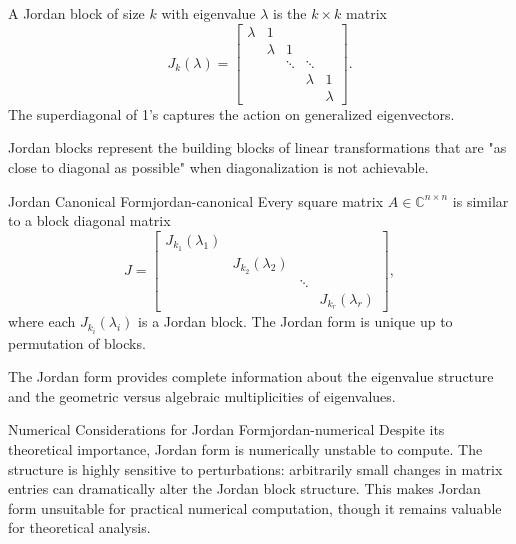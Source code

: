 \documentclass[../../main.tex]{subfiles}
\begin{document}
A Jordan block of size $k$ with eigenvalue $\lambda$ is the $k \times k$ matrix
\[
    J_k(\lambda) = \begin{bmatrix}
        \lambda & 1       &        &         &         \\
                & \lambda & 1      &         &         \\
                &         & \ddots & \ddots  &         \\
                &         &        & \lambda & 1       \\
                &         &        &         & \lambda
    \end{bmatrix}.
\]
The superdiagonal of 1's captures the action on generalized eigenvectors.

Jordan blocks represent the building blocks of linear transformations that are "as close to diagonal as possible" when diagonalization is not achievable.

\begin{definition}{Jordan Canonical Form}{jordan-canonical}
    Every square matrix $A \in \mathbb{C}^{n \times n}$ is similar to a block diagonal matrix
    \[
        J = \begin{bmatrix}
            J_{k_1}(\lambda_1) &                    &        &                    \\
                               & J_{k_2}(\lambda_2) &        &                    \\
                               &                    & \ddots &                    \\
                               &                    &        & J_{k_r}(\lambda_r)
        \end{bmatrix},
    \]
    where each $J_{k_i}(\lambda_i)$ is a Jordan block. The Jordan form is unique up to permutation of blocks.
\end{definition}

The Jordan form provides complete information about the eigenvalue structure and the geometric versus algebraic multiplicities of eigenvalues.

\begin{remark}{Numerical Considerations for Jordan Form}{jordan-numerical}
    Despite its theoretical importance, Jordan form is numerically unstable to compute. The structure is highly sensitive to perturbations: arbitrarily small changes in matrix entries can dramatically alter the Jordan block structure. This makes Jordan form unsuitable for practical numerical computation, though it remains valuable for theoretical analysis.
\end{remark}
\end{document}
